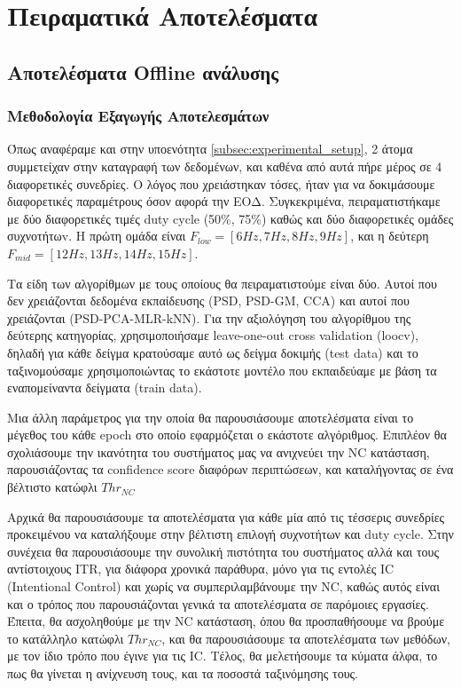\documentclass[11pt,a4paper,english,greek,twoside]{../Thesis}
\begin{document}
\chapter{Πειραματικά Αποτελέσματα} \label{chap:Results}

\section{Αποτελέσματα Offline ανάλυσης}

\subsection{Μεθοδολογία Εξαγωγής Αποτελεσμάτων}

\par Όπως αναφέραμε και στην υποενότητα \ref{subsec:experimental_setup}, 2 άτομα συμμετείχαν στην καταγραφή των δεδομένων, και καθένα από αυτά πήρε μέρος σε 4 διαφορετικές συνεδρίες. Ο λόγος που χρειάστηκαν τόσες, ήταν για να δοκιμάσουμε διαφορετικές παραμέτρους όσον αφορά την ΕΟΔ. Συγκεκριμένα, πειραματιστήκαμε με δύο διαφορετικές τιμές duty cycle (50\%, 75\%) καθώς και δύο διαφορετικές ομάδες συχνοτήτωv. Η πρώτη ομάδα είναι $F_{low} = [6Hz,7Hz,8Hz,9Hz]$, και η δεύτερη $F_{mid} = [12Hz,13Hz,14Hz,15Hz]$.

\par Τα είδη των αλγορίθμων με τους οποίους θα πειραματιστούμε είναι δύο. Αυτοί που δεν χρειάζονται δεδομένα εκπαίδευσης (PSD, PSD-GM, CCA) και αυτοί που χρειάζονται (PSD-PCA-MLR-kNN). Για την αξιολόγηση του αλγορίθμου της δεύτερης κατηγορίας, χρησιμοποιήσαμε leave-one-out cross validation (loocv), δηλαδή για κάθε δείγμα κρατούσαμε αυτό ως δείγμα δοκιμής (test data) και το ταξινομούσαμε χρησιμοποιώντας το εκάστοτε μοντέλο που εκπαιδεύαμε με βάση τα εναπομείναντα δείγματα (train data).

\par Μια άλλη παράμετρος για την οποία θα παρουσιάσουμε αποτελέσματα είναι το μέγεθος του κάθε epoch στο οποίο εφαρμόζεται ο εκάστοτε αλγόριθμος. Επιπλέον θα σχολιάσουμε την ικανότητα του συστήματος μας να ανιχνεύει την NC κατάσταση, παρουσιάζοντας τα confidence score διαφόρων περιπτώσεων, και καταλήγοντας σε ένα βέλτιστο κατώφλι $Thr_{NC}$

\par Αρχικά θα παρουσιάσουμε τα αποτελέσματα για κάθε μία από τις τέσσερις συνεδρίες προκειμένου να καταλήξουμε στην βέλτιστη επιλογή συχνοτήτων και duty cycle. Στην συνέχεια θα παρουσιάσουμε την συνολική πιστότητα του συστήματος αλλά και τους αντίστοιχους ITR, για διάφορα χρονικά παράθυρα, μόνο για τις εντολές IC (Intentional Control) και χωρίς να συμπεριλαμβάνουμε την NC, καθώς αυτός είναι και ο τρόπος που παρουσιάζονται γενικά τα αποτελέσματα σε παρόμοιες εργασίες. Έπειτα, θα ασχοληθούμε με την NC κατάσταση, όπου θα προσπαθήσουμε να βρούμε το κατάλληλο κατώφλι $Thr_{NC}$, και θα παρουσιάσουμε τα αποτελέσματα των μεθόδων, με τον ίδιο τρόπο που έγινε για τις IC. Τέλος, θα μελετήσουμε τα κύματα άλφα, το πως θα γίνεται η ανίχνευση τους, και τα ποσοστά ταξινόμησης τους.
\end{document}
